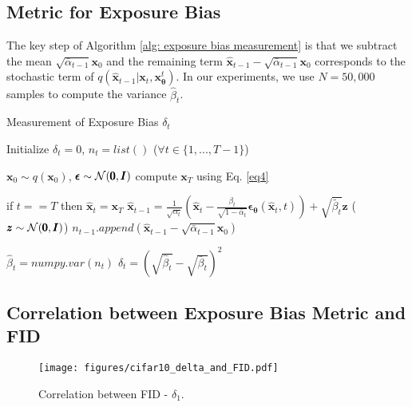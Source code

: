 \documentclass{article} \usepackage{iclr2024_conference,times}
\begin{document}
\subsection{Metric for Exposure Bias}
\label{Append:0}
The key step of Algorithm \ref{alg: exposure bias measurement} is that we subtract the mean $\sqrt{\bar{\alpha}_{t-1}} \pmb{x}_0$ and the remaining term $\hat{\pmb{x}}_{t-1} - \sqrt{\bar{\alpha}_{t-1}} \pmb{x}_0$ corresponds to the stochastic term of $q(\hat{\pmb{x}}_{t-1} | \pmb{x}_{t}, \pmb{x}^{t}_{\pmb{\theta}})$. In our experiments, we use $N=50,000$ samples to compute the variance $\hat{\beta}_t$.


\begin{algorithm}[h]
   \caption{Measurement of Exposure Bias $\delta_t$}
   \label{alg: exposure bias measurement}
\begin{algorithmic}[1]
        \STATE Initialize $\delta_t = 0$, $n_t = list()$ ($\forall t \in \{1, ..., T-1 \}$)
        
        \REPEAT
        \STATE $\pmb{x}_0 \sim q(\pmb{x}_0)$, $\pmb{\epsilon} \sim {\cal N} (\pmb{0}, \pmb{I})$
        \STATE compute $\pmb{x}_T$ using Eq. \ref{eq4}
        
        \STATE if $t == T$ then $\hat{\pmb{x}}_{t} = \pmb{x}_T$
        \STATE $\hat{\pmb{x}}_{t-1} = \frac{1}{\sqrt{\alpha_{t}}} (\hat{\pmb{x}}_{t} - \frac{\beta_{t}}{\sqrt{1-\bar{\alpha}_{t}}} \pmb{\epsilon}_{\pmb{\theta}} (\hat{\pmb{x}}_{t}, t)) + \sqrt{\tilde{\beta_t}} \pmb{z}$ \quad ($\pmb{z} \sim {\cal N} (\pmb{0}, \pmb{I})$)
        \STATE $n_{t-1}.append(\hat{\pmb{x}}_{t-1} - \sqrt{\bar{\alpha}_{t-1}} \pmb{x}_0)$ 
        \ENDFOR
        
        \STATE $\hat{\beta}_t = numpy.var(n_t)$
        \STATE $\delta_t = (\sqrt{\hat{\beta}_t} - \sqrt{\bar{\beta}_t})^2$
        \ENDFOR
    \end{algorithmic}
\end{algorithm}



\subsection{Correlation between Exposure Bias Metric and FID}
\label{Append: delta_t and FID}

\begin{wrapfigure}{r}{0.4\textwidth}
\vskip -0.3in
  \texttt{[image: figures/cifar10\_delta\_and\_FID.pdf]}
  \captionsetup{skip=2pt}
  \caption{Correlation between FID - $\delta_1$.}
  \label{fig: delta_t_and_FID}
\vskip -0.6in
\end{wrapfigure}
\end{document}
